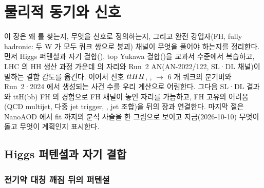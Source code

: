 \chapter{물리적 동기와 신호}\label{ch:intro}

이 장은 왜 \ttHH 를 찾는지, 무엇을 신호로 정의하는지, 그리고 완전 강입자(FH, fully hadronic: 두 W 가 모두 쿼크 쌍으로 붕괴) 채널이
무엇을 풀어야 하는지를 정리한다. 먼저 Higgs 퍼텐셜과 자기 결합(\kl), top Yukawa 결합(\kt)을 교과서 수준에서 복습하고, LHC 의 HH 생산 과정
가운데 \ttHH 의 자리와 Run~2 AN(AN-2022/122, SL·DL 채널)이 말하는 결합 감도를 옮긴다. 이어서 신호 $t\bar{t}HH$, \HHfourb, \ttbar$\to$ 6 개 쿼크의
분기비와 Run~2·2024 에서 생성되는 사건 수를 우리 계산으로 어림한다. 그다음 SL·DL 결과와 ttH(bb) FH 의 경험으로 FH 채널이 놓인 자리를 가늠하고,
FH 고유의 어려움(QCD multijet, 다중 jet trigger, \ttbb, jet 조합)을 뒤의 장과 연결한다. 마지막 절은 NanoAOD 에서 fit 까지의 분석 사슬을 한 그림으로
보이고 지금(2026-10-10) 무엇이 돌고 무엇이 계획인지 표시한다.

\section{Higgs 퍼텐셜과 자기 결합}\label{sec:intro-potential}

\subsection{전기약 대칭 깨짐 뒤의 퍼텐셜}

